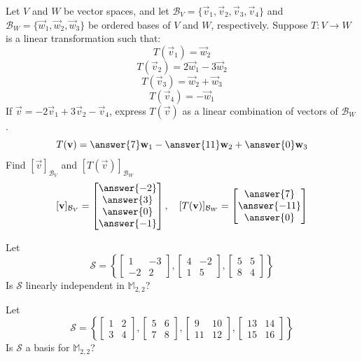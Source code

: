 \documentclass{ximera}
\begin{document}
\begin{problem}\label{prob:lintransandbasis4} Let $V$ and $W$ be vector spaces, and let $\mathcal{B}_V=\{\vec{v}_1, \vec{v}_2, \vec{v}_3, \vec{v}_4\}$ and $\mathcal{B}_W=\{\vec{w}_1,\vec{w}_2, \vec{w}_3\}$ be ordered bases of $V$ and $W$, respectively.  Suppose $T:V\rightarrow W$ is a linear transformation such that: $$T(\vec{v}_1)=\vec{w}_2$$ $$T(\vec{v}_2)=2\vec{w}_1-3\vec{w}_2$$
$$T(\vec{v}_3)=\vec{w}_2+\vec{w}_3$$
$$T(\vec{v}_4)=-\vec{w}_1$$
If $\vec{v}=-2\vec{v}_1+3\vec{v}_2-\vec{v}_4$, express $T(\vec{v})$ as a linear combination of vectors of $\mathcal{B}_W$.
$$T(\vec{v})=\answer{7}\vec{w}_1-\answer{11}\vec{w}_2+\answer{0}\vec{w}_3$$
Find $[\vec{v}]_{\mathcal{B}_V}$ and $[T(\vec{v})]_{\mathcal{B}_{W}}$
$$[\vec{v}]_{\mathcal{B}_V}=\begin{bmatrix}\answer{-2}\\\answer{3}\\\answer{0}\\\answer{-1}\end{bmatrix},\quad [T(\vec{v})]_{\mathcal{B}_{W}}=\begin{bmatrix}\answer{7}\\\answer{-11}\\\answer{0}\end{bmatrix}$$
\end{problem}

\begin{problem}\label{prob:useisoshowlinind}
Let 
$$\mathcal{S}=\left\{\begin{bmatrix}1&-3\\-2&2\end{bmatrix}, \begin{bmatrix}4&-2\\1&5\end{bmatrix}, \begin{bmatrix}5&5\\8&4\end{bmatrix}\right\}$$
Is $\mathcal{S}$ linearly independent in $\mathbb{M}_{2,2}$?  
\end{problem}

\begin{problem}\label{prob:basism22iso}
Let 
$$\mathcal{S}=\left\{\begin{bmatrix}1&2\\3&4\end{bmatrix}, \begin{bmatrix}5&6\\7&8\end{bmatrix}, \begin{bmatrix}9&10\\11&12\end{bmatrix}, \begin{bmatrix}13&14\\15&16\end{bmatrix}\right\}$$
Is $\mathcal{S}$ a basis for $\mathbb{M}_{2,2}$? 
\end{problem}
\end{document}
